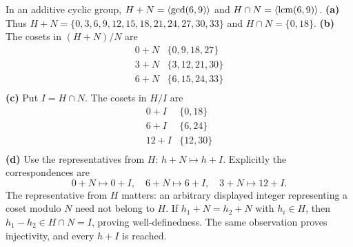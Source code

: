 \idea In an additive cyclic group, $H+N=\langle \gcd(6,9)\rangle$ and $H\cap N=\langle \operatorname{lcm}(6,9)\rangle$.
\textbf{(a)} Thus $H+N=\{0,3,6,9,12,15,18,21,24,27,30,33\}$ and
$H\cap N=\{0,18\}$.
\textbf{(b)} The cosets in $(H+N)/N$ are
\[\begin{array}{c|l}
0+N & \{0,9,18,27\}\\
3+N & \{3,12,21,30\}\\
6+N & \{6,15,24,33\}\\\end{array}\]\textbf{(c)} Put $I=H\cap N$. The cosets in $H/I$ are\[\begin{array}{c|l}
0+I & \{0,18\}\\
6+I & \{6,24\}\\
12+I & \{12,30\}\\\end{array}\]\textbf{(d)} Use the representatives from $H$: $h+N\mapsto h+I$.
Explicitly the correspondences are
\[
0+N\longmapsto 0+I,\quad 6+N\longmapsto 6+I,\quad 3+N\longmapsto 12+I.
\]
The representative from $H$ matters: an arbitrary displayed integer representing a coset modulo $N$ need not belong to $H$.
If $h_1+N=h_2+N$ with $h_i\in H$, then $h_1-h_2\in H\cap N=I$, proving well-definedness. The same observation proves injectivity, and every $h+I$ is reached.

